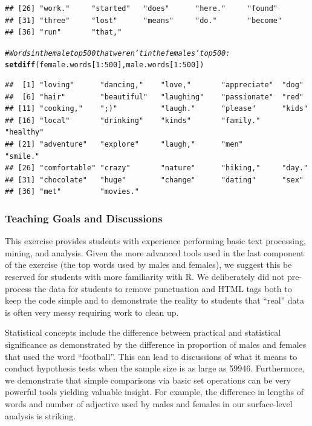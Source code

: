 \documentclass{article}\usepackage[]{graphicx}\usepackage[]{color}
\makeatletter
\newcommand{\hlnum}[1]{\textcolor[rgb]{0.686,0.059,0.569}{#1}}%
\newcommand{\hlcom}[1]{\textcolor[rgb]{0.678,0.584,0.686}{\textit{#1}}}%
\newcommand{\hlopt}[1]{\textcolor[rgb]{0,0,0}{#1}}%
\newcommand{\hlstd}[1]{\textcolor[rgb]{0.345,0.345,0.345}{#1}}%
\newcommand{\hlkwd}[1]{\textcolor[rgb]{0.737,0.353,0.396}{\textbf{#1}}}%
\newenvironment{kframe}{%
 \def\at@end@of@kframe{}%
 \ifinner\ifhmode%
  \def\at@end@of@kframe{\end{minipage}}%
  \begin{minipage}{\columnwidth}%
 \fi\fi%
 \def\FrameCommand##1{\hskip\@totalleftmargin \hskip-\fboxsep
 \colorbox{shadecolor}{##1}\hskip-\fboxsep
     \hskip-\linewidth \hskip-\@totalleftmargin \hskip\columnwidth}%
 \MakeFramed {\advance\hsize-\width
   \@totalleftmargin\z@ \linewidth\hsize
   \@setminipage}}%
 {\par\unskip\endMakeFramed%
 \at@end@of@kframe}
\newenvironment{knitrout}{}{} %
\makeatother
\begin{document}
\begin{knitrout}
\begin{kframe}
\begin{verbatim}
## [26] "work."     "started"   "does"      "here."     "found"    
## [31] "three"     "lost"      "means"     "do."       "become"   
## [36] "run"       "that,"
\end{verbatim}
\begin{alltt}
\hlcom{# Words in the male top 500 that weren't in the females' top 500:}
\hlkwd{setdiff}\hlstd{(female.words[}\hlnum{1}\hlopt{:}\hlnum{500}\hlstd{], male.words[}\hlnum{1}\hlopt{:}\hlnum{500}\hlstd{])}
\end{alltt}
\begin{verbatim}
##  [1] "loving"      "dancing,"    "love,"       "appreciate"  "dog"        
##  [6] "hair"        "beautiful"   "laughing"    "passionate"  "red"        
## [11] "cooking,"    ";)"          "laugh."      "please"      "kids"       
## [16] "local"       "drinking"    "kinds"       "family."     "healthy"    
## [21] "adventure"   "explore"     "laugh,"      "men"         "smile."     
## [26] "comfortable" "crazy"       "nature"      "hiking,"     "day."       
## [31] "chocolate"   "huge"        "change"      "dating"      "sex"        
## [36] "met"         "movies."
\end{verbatim}
\end{kframe}
\end{knitrout}




\subsubsection{Teaching Goals and Discussions}
This exercise provides students with experience performing basic text processing, mining, and analysis.  Given the more advanced tools used in the last component of the exercise (the top words used by males and females), we suggest this be reserved for students with more familiarity with R.  We deliberately did not pre-process the data for students to remove punctuation and HTML tags both to keep the code simple and to demonstrate the reality to students that ``real'' data is often very messy requiring work to clean up.

Statistical concepts include the difference between practical and statistical significance as demonstrated by the difference in proportion of males and females that used the word ``football''.  This can lead to discussions of what it means to conduct hypothesis tests when the sample size is as large as 59946.  Furthermore, we demonstrate that simple comparisons via basic set operations can be very powerful tools yielding valuable insight.  For example, the difference in lengths of words and number of adjective used by males and females in our surface-level analysis is striking.
\end{document}
